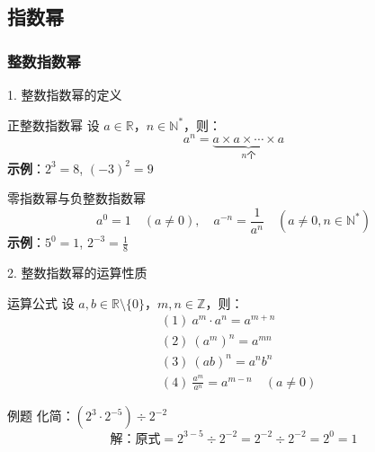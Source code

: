 \subsection{指数幂}
\subsubsection{整数指数幂}
\begin{frame}{1. 整数指数幂的定义}
    \begin{block}{正整数指数幂}
        设 \( a \in \mathbb{R} \)，\( n \in \mathbb{N}^* \)，则：
        \[
        a^n = \underbrace{a \times a \times \cdots \times a}_{n\text{个}}
        \]
        \vspace{0.5cm}
        \textbf{示例}：\( 2^3 = 8 \), \( (-3)^2 = 9 \)
    \end{block}

    \begin{block}{零指数幂与负整数指数幂}
        \[
        a^0 = 1 \quad (a \neq 0), \quad a^{-n} = \frac{1}{a^n} \quad (a \neq 0, n \in \mathbb{N}^*)
        \]
        \vspace{0.5cm}
        \textbf{示例}：\( 5^0 = 1 \), \( 2^{-3} = \frac{1}{8} \)
    \end{block}
\end{frame}

\begin{frame}{2. 整数指数幂的运算性质}
    \begin{block}{运算公式}
        设 \( a, b \in \mathbb{R} \setminus \{0\} \)，\( m, n \in \mathbb{Z} \)，则：
        \[
        \begin{aligned}
        &(1)\ a^m \cdot a^n = a^{m+n} \\
        &(2)\ (a^m)^n = a^{mn} \\
        &(3)\ (ab)^n = a^n b^n \\
        &(4)\ \frac{a^m}{a^n} = a^{m-n} \quad (a \neq 0)
        \end{aligned}
        \]
    \end{block}

    \begin{exampleblock}{例题}
        化简：\( (2^3 \cdot 2^{-5}) \div 2^{-2} \)
        \[
        \text{解：原式} = 2^{3-5} \div 2^{-2} = 2^{-2} \div 2^{-2} = 2^0 = 1
        \]
    \end{exampleblock}
\end{frame}



